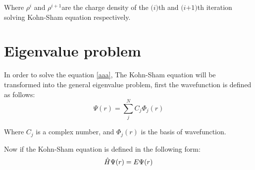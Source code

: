 \documentclass[a4paper, 12pt, titlepage,oneside,drop]{kthesis}
\begin{document}
\noindent Where $\rho^{i}$ and $\rho^{i+1}$are the charge density of the $\textit{(i)}$th and $\textit {(i+1)}$th iteration solving Kohn-Sham equation respectively.

\vspace{100cm}

\section{Eigenvalue problem}
\noindent In order to solve the equation \ref{aaa}, The Kohn-Sham equation will be transformed into the general eigenvalue problem, first the wavefunction is defined as follows:
\begin{equation}\label{ep1}
 \Psi (r) = \sum\limits_j^N C_j \Phi_j (r)
\end{equation}
 
\noindent Where $C_j$ is a complex number, and $\Phi_j (r)$ is the basis of wavefunction. 

\noindent Now if the Kohn-Sham equation is defined in the following form:
\begin{equation}\label{ep2}
 \hat{H} \Psi (r) = E \Psi (r)
\end{equation}
 
\end{document}
